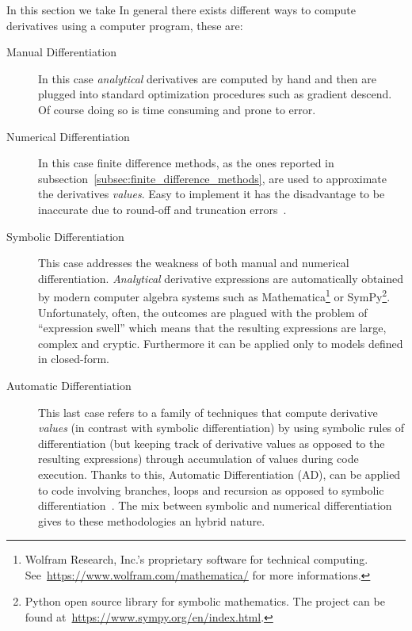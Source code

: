 In this section we take 
In general there exists different ways to compute derivatives using a computer program, these are:
\begin{description}
	\item[Manual Differentiation] In this case \emph{analytical} derivatives are computed by hand and then are plugged into standard optimization procedures such as gradient descend. Of course doing so is time consuming and prone to error.
	
	\item[Numerical Differentiation] In this case finite difference methods, as the ones reported in subsection~\ref{subsec:finite_difference_methods}, are used to approximate the derivatives \emph{values}. Easy to implement it has the disadvantage to be inaccurate due to round-off and truncation errors~\cite{LeVeque:FD_book}.

	\item[Symbolic Differentiation] This case addresses the weakness of both manual and numerical differentiation. \emph{Analytical} derivative expressions are automatically obtained by modern computer algebra systems such as Mathematica\footnote{Wolfram Research, Inc.'s proprietary software for technical computing. See~\url{https://www.wolfram.com/mathematica/} for more informations.} or SymPy\footnote{Python open source library for symbolic mathematics. The project can be found at~\url{https://www.sympy.org/en/index.html}.}. Unfortunately, often, the outcomes are plagued with the problem of ``expression swell'' which means that the resulting expressions are large, complex and cryptic. Furthermore it can be applied only to models defined in closed-form.
	
	\item[Automatic Differentiation] This last case refers to a family of techniques that compute derivative \emph{values} (in contrast with symbolic differentiation) by using symbolic rules of differentiation (but keeping track of derivative values as opposed to the resulting expressions) through accumulation of values during code execution. Thanks to this, Automatic Differentiation (AD), can be applied to code involving branches, loops and recursion as opposed to symbolic differentiation~\cite{Baydin:AD_survey}. The mix between symbolic and numerical differentiation gives to these methodologies an hybrid nature.
\end{description}

